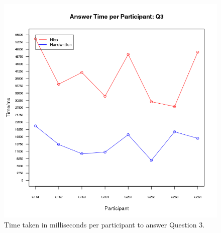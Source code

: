 \documentclass[12pt,twoside,notitlepage,xetex]{report}
\begin{document}
{\begin{center}
\begin{figure}[H]
\begin{center}
\includegraphics[height=\textheight/2-2cm]{figs/graphs/q3.png}
\end{center}
\caption{Time taken in milliseconds per participant to answer Question 3.}
\end{figure}
\end{center}

}
\end{document}
